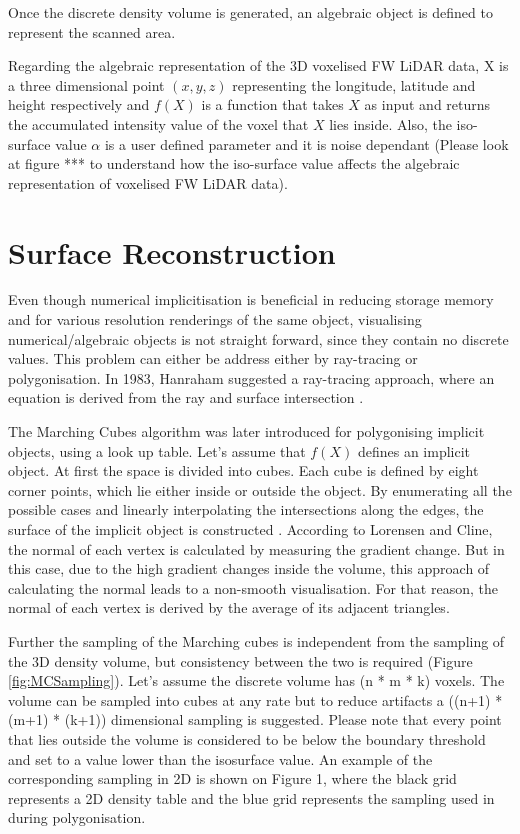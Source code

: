 \documentclass{subfiles}
\begin{document}
\par Once the discrete density volume is generated, an algebraic object is defined to represent the scanned area. 

\par Regarding the algebraic representation of the 3D voxelised FW LiDAR data, X is a three dimensional point $\mathit{(x, y, z) }$ representing the longitude, latitude and height respectively and ${f(X)}$ is a function that takes  $\mathit{X}$ as input and returns the accumulated intensity value of the voxel that  $\mathit{X}$ lies inside. Also, the iso-surface value $\mathit{\alpha }$ is a user defined parameter and it is noise dependant (Please look at figure *** to understand how the iso-surface value affects the algebraic representation of voxelised FW LiDAR data). 




\section {Surface Reconstruction}\label{sec:SurfaceReconstruction}
\par Even though numerical implicitisation is beneficial in reducing storage memory and for various resolution renderings of the same object, visualising numerical/algebraic objects is not straight forward, since they contain no discrete values. This problem can either be address either by ray-tracing or polygonisation. In 1983, Hanraham suggested a ray-tracing approach, where an equation is derived from the ray and surface intersection \cite{Hanrahan1983}.  

\par The Marching Cubes algorithm was later introduced for polygonising implicit objects, using a look up table. Let’s assume that $f(X)$ defines an implicit object. At first the space is divided into cubes. Each cube is defined by eight corner points, which lie either inside or outside the object. By enumerating all the possible cases and linearly interpolating the intersections along the edges, the surface of the implicit object is constructed \cite{Lorensen1987}. According to Lorensen and Cline, the normal of each vertex is calculated by measuring the gradient change. But in this case, due to the high gradient changes inside the volume, this approach of calculating the normal leads to a non-smooth visualisation. For that reason, the normal of each vertex is derived by the average of its adjacent triangles. 

\par Further the sampling of the Marching cubes is independent from the sampling of the 3D density volume, but consistency between the two is required (Figure \ref{fig:MCSampling}). Let’s assume the discrete volume has (n * m * k) voxels. The volume can be sampled into cubes at any rate but to reduce artifacts a ((n+1) *(m+1) * (k+1)) dimensional sampling is suggested. Please note that every point that lies outside the volume is considered to be below the boundary threshold and set to a value lower than the isosurface value. An example of the corresponding sampling in 2D is shown on Figure 1, where the black grid represents a 2D density table and the blue grid represents the sampling used in during polygonisation.
\end{document}
